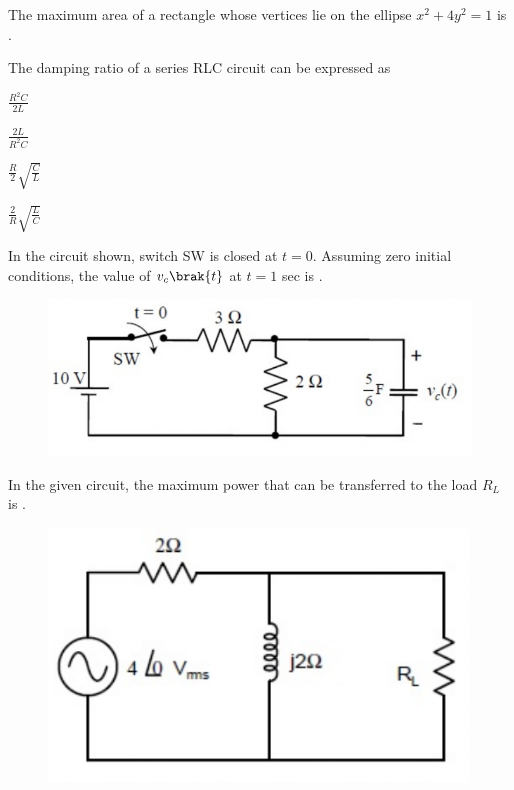     \hfill{}

    \item The maximum area  of a rectangle whose vertices lie on the ellipse $x^{2}+4y^{2}=1$ is \underline{\hspace{2cm}}.
    
    \hfill{}

    \item The damping ratio of a series RLC circuit can be expressed as
    \begin{enumerate}
        \begin{multicols}{2}
            \item $\frac{R^{2}C}{2L}$
            \item $\frac{2L}{R^{2}C}$
            \item $\frac{R}{2}\sqrt{\frac{C}{L}}$
            \item $\frac{2}{R}\sqrt{\frac{L}{C}}$
        \end{multicols}
    \end{enumerate}
    
    \hfill{}

    \item In the circuit shown, switch SW is closed at $t=0$. Assuming zero initial conditions, the value of $v_{c}\brak{t}$  at $t=1$ sec is \underline{\hspace{2cm}}.
    \begin{figure}[H]
        \centering
        \includegraphics[width=0.5\columnwidth]{figs/q41.png}
        \caption*{}
        \label{fig:q41}
    \end{figure}
    
    \hfill{}

    \item In the given circuit, the maximum power  that can be transferred to the load $R_{L}$ is \underline{\hspace{2cm}}.
    \begin{figure}[H]
        \centering
        \includegraphics[width=0.5\columnwidth]{figs/q42.png}
        \caption*{}
        \label{fig:q42}
    \end{figure}
    
